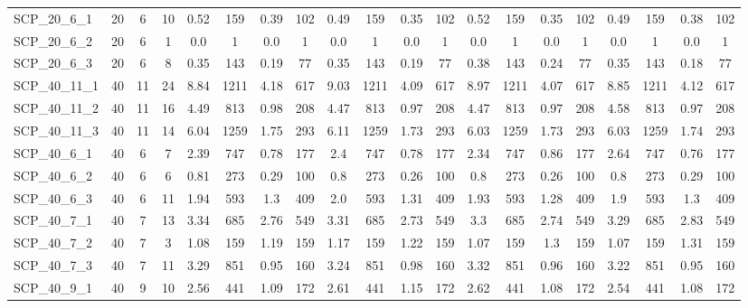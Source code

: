 \begin{sidewaystable}[!ht]
{\begin{tabular}{lccccccccccccccccccc}
SCP\_20\_6\_1 & 20 & 6 & 10 & 0.52 & 159 & 0.39 & 102 & 0.49 & 159 &  \textcolor{blue2}{0.35} & 102 & 0.52 & 159 &  \textcolor{blue2}{0.35} & 102 & 0.49 & 159 & 0.38 & 102 \\
SCP\_20\_6\_2 & 20 & 6 & 1 &  \textcolor{blue2}{0.0} & 1 &  \textcolor{blue2}{0.0} & 1 &  \textcolor{blue2}{0.0} & 1 &  \textcolor{blue2}{0.0} & 1 &  \textcolor{blue2}{0.0} & 1 &  \textcolor{blue2}{0.0} & 1 &  \textcolor{blue2}{0.0} & 1 &  \textcolor{blue2}{0.0} & 1 \\
SCP\_20\_6\_3 & 20 & 6 & 8 & 0.35 & 143 & 0.19 & 77 & 0.35 & 143 & 0.19 & 77 & 0.38 & 143 & 0.24 & 77 & 0.35 & 143 &  \textcolor{blue2}{0.18} & 77 \\
SCP\_40\_11\_1 & 40 & 11 & 24 & 8.84 & 1211 & 4.18 & 617 & 9.03 & 1211 & 4.09 & 617 & 8.97 & 1211 &  \textcolor{blue2}{4.07} & 617 & 8.85 & 1211 & 4.12 & 617 \\
SCP\_40\_11\_2 & 40 & 11 & 16 & 4.49 & 813 & 0.98 & 208 & 4.47 & 813 &  \textcolor{blue2}{0.97} & 208 & 4.47 & 813 &  \textcolor{blue2}{0.97} & 208 & 4.58 & 813 &  \textcolor{blue2}{0.97} & 208 \\
SCP\_40\_11\_3 & 40 & 11 & 14 & 6.04 & 1259 & 1.75 & 293 & 6.11 & 1259 & 1.73 & 293 & 6.03 & 1259 & 1.73 & 293 & 6.03 & 1259 & 1.74 & 293 \\
SCP\_40\_6\_1 & 40 & 6 & 7 & 2.39 & 747 & 0.78 & 177 & 2.4 & 747 & 0.78 & 177 & 2.34 & 747 & 0.86 & 177 & 2.64 & 747 &  \textcolor{blue2}{0.76} & 177 \\
SCP\_40\_6\_2 & 40 & 6 & 6 & 0.81 & 273 & 0.29 & 100 & 0.8 & 273 &  \textcolor{blue2}{0.26} & 100 & 0.8 & 273 &  \textcolor{blue2}{0.26} & 100 & 0.8 & 273 & 0.29 & 100 \\
SCP\_40\_6\_3 & 40 & 6 & 11 & 1.94 & 593 & 1.3 & 409 & 2.0 & 593 & 1.31 & 409 & 1.93 & 593 &  \textcolor{blue2}{1.28} & 409 & 1.9 & 593 & 1.3 & 409 \\
SCP\_40\_7\_1 & 40 & 7 & 13 & 3.34 & 685 & 2.76 & 549 & 3.31 & 685 &  \textcolor{blue2}{2.73} & 549 & 3.3 & 685 & 2.74 & 549 & 3.29 & 685 & 2.83 & 549 \\
SCP\_40\_7\_2 & 40 & 7 & 3 & 1.08 & 159 & 1.19 & 159 & 1.17 & 159 & 1.22 & 159 & 1.07 & 159 & 1.3 & 159 & 1.07 & 159 & 1.31 & 159 \\
SCP\_40\_7\_3 & 40 & 7 & 11 & 3.29 & 851 & 0.95 & 160 & 3.24 & 851 & 0.98 & 160 & 3.32 & 851 & 0.96 & 160 & 3.22 & 851 & 0.95 & 160 \\
SCP\_40\_9\_1 & 40 & 9 & 10 & 2.56 & 441 & 1.09 & 172 & 2.61 & 441 & 1.15 & 172 & 2.62 & 441 &  \textcolor{blue2}{1.08} & 172 & 2.54 & 441 &  \textcolor{blue2}{1.08} & 172 \\

\end{tabular}}
\end{sidewaystable}
